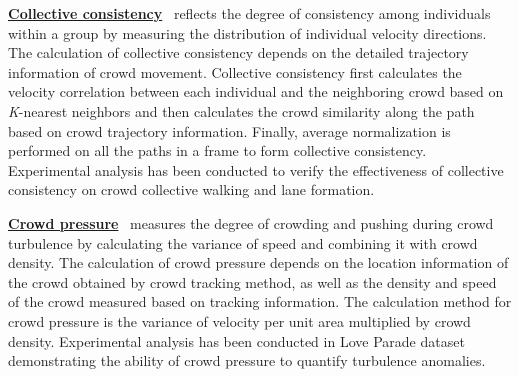 \documentclass[journal]{IEEEtran}
\begin{document}
\vskip 0.03in
\noindent \underline{\textbf{Collective consistency}}~\cite{zhou2013measuring} reflects the degree of consistency among individuals within a group by measuring the distribution of individual velocity directions. The calculation of collective consistency depends on the detailed trajectory information of crowd movement. Collective consistency first calculates the velocity correlation between each individual and the neighboring crowd based on \textit{K}-nearest neighbors and then calculates the crowd similarity along the path based on crowd trajectory information. Finally, average normalization is performed on all the paths in a frame to form collective consistency. Experimental analysis has been conducted to verify the effectiveness of collective consistency on crowd collective walking and lane formation.

\vskip 0.03in
\noindent \underline{\textbf{Crowd pressure}}~\cite{johansson2008crowd} measures the degree of crowding and pushing during crowd turbulence by calculating the variance of speed and combining it with crowd density. The calculation of crowd pressure depends on the location information of the crowd obtained by crowd tracking method, as well as the density and speed of the crowd measured based on tracking information. The calculation method for crowd pressure is the variance of velocity per unit area multiplied by crowd density. Experimental analysis has been conducted in Love Parade dataset demonstrating the ability of crowd pressure to quantify turbulence anomalies.




\end{document}
